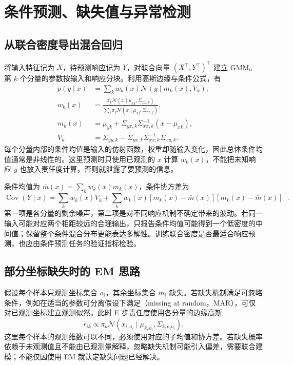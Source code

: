 \documentclass[UTF8]{ctexart}
\begin{document}
\section{条件预测、缺失值与异常检测}
\label{sec:gmm-applications}

\subsection{从联合密度导出混合回归}
将输入特征记为 $X$，待预测响应记为 $Y$，对联合向量 $(X^\top,Y^\top)^\top$ 建立 GMM。第 $k$ 个分量的参数按输入和响应分块。利用高斯边缘与条件公式，有
\begin{align}
p(y\mid x)&=\sum_kw_k(x)\mathcal N(y\mid m_k(x),V_k),\label{eq:gmm-conditional-mixture}\\
w_k(x)&=\frac{\pi_k\mathcal N(x\mid\mu_{xk},\Sigma_{xx,k})}
{\sum_j\pi_j\mathcal N(x\mid\mu_{xj},\Sigma_{xx,j})},\nonumber\\
m_k(x)&=\mu_{yk}+\Sigma_{yx,k}\Sigma_{xx,k}^{-1}(x-\mu_{xk}),\nonumber\\
V_k&=\Sigma_{yy,k}-\Sigma_{yx,k}\Sigma_{xx,k}^{-1}\Sigma_{xy,k}.\nonumber
\end{align}
每个分量内部的条件均值是输入的仿射函数，权重却随输入变化，因此总体条件均值通常是非线性的。这里预测时只使用已观测的 $x$ 计算 $w_k(x)$，不能把未知响应 $y$ 也放入责任度计算，否则就泄露了要预测的信息。

条件均值为 $\bar m(x)=\sum_kw_k(x)m_k(x)$，条件协方差为
\[
\operatorname{Cov}(Y\mid x)=\sum_kw_k(x)V_k
+\sum_kw_k(x)[m_k(x)-\bar m(x)][m_k(x)-\bar m(x)]^\top.
\]
第一项是各分量的剩余噪声，第二项是对不同响应机制不确定带来的波动。若同一输入可能对应两个相距较远的合理输出，只报告条件均值可能得到一个低密度的中间值；保留整个条件混合分布更能表达多解性。训练联合密度是否最适合响应预测，也应由条件预测任务的验证指标检验。

\subsection{部分坐标缺失时的 EM 思路}
假设每个样本只观测坐标集合 $o_i$，其余坐标集合 $m_i$ 缺失。若缺失机制满足可忽略条件，例如在适当的参数可分离假设下满足（missing at random，MAR），可仅对已观测坐标建立观测似然。此时 E 步责任度使用各分量的边缘高斯
\[
r_{ik}\propto\pi_k\mathcal N(x_{i,o_i}\mid\mu_{k,o_i},\Sigma_{k,o_io_i}).
\]
这里每个样本的观测维数可以不同，必须使用对应的子均值和协方差。若缺失概率依赖于未观测值且不能由已观测量解释，忽略缺失机制可能引入偏差，需要联合建模；不能仅因使用 EM 就认定缺失问题已经解决。
\end{document}
